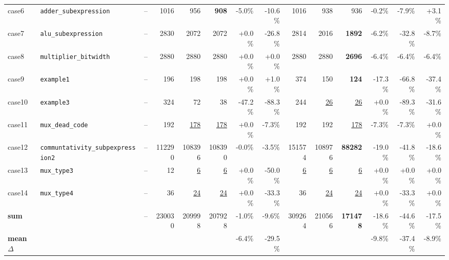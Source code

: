\begin{table}[t]
{\begin{tabular}{llrrrrrrrrrrrr}
case6 & \texttt{adder\_subexpression} & -- & 1016 & 956 & \textbf{908} & -5.0\% & -10.6\% & 1016 & 938 & 936 & -0.2\% & -7.9\% & +3.1\% \\
case7 & \texttt{alu\_subexpression} & -- & 2830 & 2072 & 2072 & +0.0\% & -26.8\% & 2814 & 2016 & \textbf{1892} & -6.2\% & -32.8\% & -8.7\% \\
case8 & \texttt{multiplier\_bitwidth} & -- & 2880 & 2880 & 2880 & +0.0\% & +0.0\% & 2880 & 2880 & \textbf{2696} & -6.4\% & -6.4\% & -6.4\% \\
case9 & \texttt{example1} & -- & 196 & 198 & 198 & +0.0\% & +1.0\% & 374 & 150 & \textbf{124} & -17.3\% & -66.8\% & -37.4\% \\
case10 & \texttt{example3} & -- & 324 & 72 & 38 & -47.2\% & -88.3\% & 244 & \underline{26} & \underline{26} & +0.0\% & -89.3\% & -31.6\% \\
case11 & \texttt{mux\_dead\_code} & -- & 192 & \underline{178} & \underline{178} & +0.0\% & -7.3\% & 192 & 192 & \underline{178} & -7.3\% & -7.3\% & +0.0\% \\
case12 & \texttt{communtativity\_subpexpression2} & -- & 112290 & 108396 & 108390 & -0.0\% & -3.5\% & 151574 & 108976 & \textbf{88282} & -19.0\% & -41.8\% & -18.6\% \\
case13 & \texttt{mux\_type3} & -- & 12 & \underline{6} & \underline{6} & +0.0\% & -50.0\% & \underline{6} & \underline{6} & \underline{6} & +0.0\% & +0.0\% & +0.0\% \\
case14 & \texttt{mux\_type4} & -- & 36 & \underline{24} & \underline{24} & +0.0\% & -33.3\% & 36 & \underline{24} & \underline{24} & +0.0\% & -33.3\% & +0.0\% \\
\midrule
\textbf{sum} &  & -- & 230030 & 209998 & 207928 & -1.0\% & -9.6\% & 309264 & 210566 & \textbf{171478} & -18.6\% & -44.6\% & -17.5\% \\
\textbf{mean $\Delta$} &  &  &  &  &  & -6.4\% & -29.5\% &  &  &  & -9.8\% & -37.4\% & -8.9\% \\
\bottomrule
\end{tabular}%
}
\end{table}